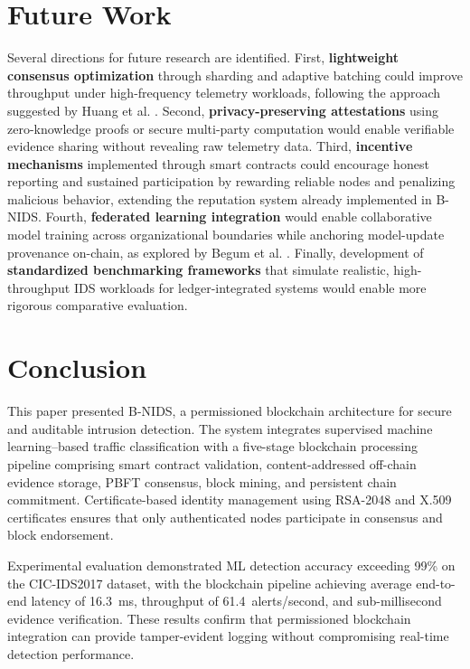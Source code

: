 \documentclass[conference]{IEEEtran}
\begin{document}
\section{Future Work}

Several directions for future research are identified. First, \textbf{lightweight consensus optimization} through sharding and adaptive batching could improve throughput under high-frequency telemetry workloads, following the approach suggested by Huang et al. \cite{jhuang2025opt}. Second, \textbf{privacy-preserving attestations} using zero-knowledge proofs or secure multi-party computation would enable verifiable evidence sharing without revealing raw telemetry data. Third, \textbf{incentive mechanisms} implemented through smart contracts could encourage honest reporting and sustained participation by rewarding reliable nodes and penalizing malicious behavior, extending the reputation system already implemented in B-NIDS. Fourth, \textbf{federated learning integration} would enable collaborative model training across organizational boundaries while anchoring model-update provenance on-chain, as explored by Begum et al. \cite{begum2024bflids}. Finally, development of \textbf{standardized benchmarking frameworks} that simulate realistic, high-throughput IDS workloads for ledger-integrated systems would enable more rigorous comparative evaluation.


\section{Conclusion}

This paper presented B-NIDS, a permissioned blockchain architecture for secure and auditable intrusion detection. The system integrates supervised machine learning--based traffic classification with a five-stage blockchain processing pipeline comprising smart contract validation, content-addressed off-chain evidence storage, PBFT consensus, block mining, and persistent chain commitment. Certificate-based identity management using RSA-2048 and X.509 certificates ensures that only authenticated nodes participate in consensus and block endorsement.

Experimental evaluation demonstrated ML detection accuracy exceeding 99\% on the CIC-IDS2017 dataset, with the blockchain pipeline achieving average end-to-end latency of 16.3~ms, throughput of 61.4~alerts/second, and sub-millisecond evidence verification. These results confirm that permissioned blockchain integration can provide tamper-evident logging without compromising real-time detection performance.
\end{document}

